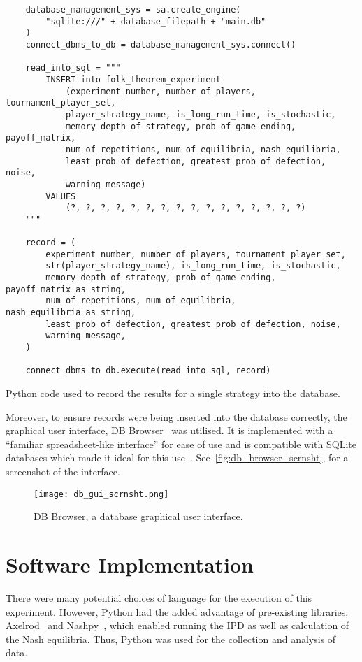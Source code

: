 \begin{listing}
\begin{verbatim}
    database_management_sys = sa.create_engine(
        "sqlite:///" + database_filepath + "main.db"
    )
    connect_dbms_to_db = database_management_sys.connect()

    read_into_sql = """
        INSERT into folk_theorem_experiment 
            (experiment_number, number_of_players, tournament_player_set, 
            player_strategy_name, is_long_run_time, is_stochastic, 
            memory_depth_of_strategy, prob_of_game_ending, payoff_matrix, 
            num_of_repetitions, num_of_equilibria, nash_equilibria, 
            least_prob_of_defection, greatest_prob_of_defection, noise, 
            warning_message)
        VALUES 
            (?, ?, ?, ?, ?, ?, ?, ?, ?, ?, ?, ?, ?, ?, ?, ?)
    """

    record = (
        experiment_number, number_of_players, tournament_player_set,
        str(player_strategy_name), is_long_run_time, is_stochastic,
        memory_depth_of_strategy, prob_of_game_ending, payoff_matrix_as_string,
        num_of_repetitions, num_of_equilibria, nash_equilibria_as_string,
        least_prob_of_defection, greatest_prob_of_defection, noise,
        warning_message,
    )

    connect_dbms_to_db.execute(read_into_sql, record)
\end{verbatim}
\caption{Python code used to record the results for a single strategy into the database.}\label{code:python_to_db}
\end{listing}

Moreover, to ensure records were being inserted into the database correctly, the
graphical user interface, DB Browser~\cite{piacentini2015db} was utilised. It is implemented
with a ``familiar spreadsheet-like interface'' for ease of use and is compatible
with SQLite databases which made it ideal for this use~\cite{piacentini2015db}.
See~\autoref{fig:db_browser_scrnsht}, for a screenshot of the interface.

\begin{figure}
    \centering
    \texttt{[image: db\_gui\_scrnsht.png]}
    \caption{DB Browser, a database graphical user interface.}\label{fig:db_browser_scrnsht}
\end{figure}


\section{Software Implementation}\label{sec:Software_Implementation}
There were many potential choices of language for the execution of this 
experiment. However, Python had the added advantage of pre-existing libraries, 
Axelrod~\cite{axelrodproject} and Nashpy~\cite{Nashpy2019}, which enabled running the IPD as well as calculation of the 
Nash equilibria. Thus, Python was used for the collection and analysis of 
data.

